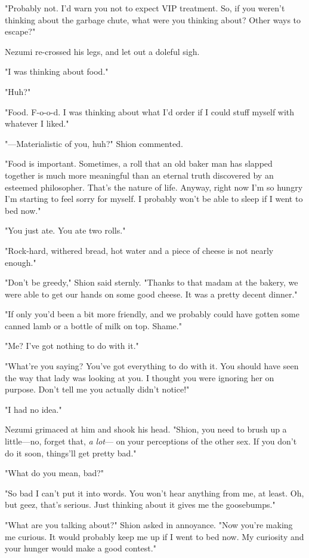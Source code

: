 "Probably not. I'd warn you not to expect VIP treatment. So, if you
weren't thinking about the garbage chute, what were you thinking about?
Other ways to escape?"

Nezumi re-crossed his legs, and let out a doleful sigh.

"I was thinking about food."

"Huh?"

"Food. F-o-o-d. I was thinking about what I'd order if I could stuff
myself with whatever I liked."

"---Materialistic of you, huh?" Shion commented.

"Food is important. Sometimes, a roll that an old baker man has slapped
together is much more meaningful than an eternal truth discovered by an
esteemed philosopher. That's the nature of life. Anyway, right now I'm
so hungry I'm starting to feel sorry for myself. I probably won't be
able to sleep if I went to bed now."

"You just ate. You ate two rolls."

"Rock-hard, withered bread, hot water and a piece of cheese is not
nearly enough."

"Don't be greedy," Shion said sternly. "Thanks to that madam at the
bakery, we were able to get our hands on some good cheese. It was a
pretty decent dinner."

"If only you'd been a bit more friendly, and we probably could have
gotten some canned lamb or a bottle of milk on top. Shame."

"Me? I've got nothing to do with it."

"What're you saying? You've got everything to do with it. You should
have seen the way that lady was looking at you. I thought you were
ignoring her on purpose. Don't tell me you actually didn't notice!"

"I had no idea."

Nezumi grimaced at him and shook his head. "Shion, you need to brush up
a little---no, forget that, \emph{a lot}--- on your perceptions of the other sex.
If you don't do it soon, things'll get pretty bad."

"What do you mean, bad?"

"So bad I can't put it into words. You won't hear anything from me, at
least. Oh, but geez, that's serious. Just thinking about it gives me the
goosebumps."

"What are you talking about?" Shion asked in annoyance. "Now you're
making me curious. It would probably keep me up if I went to bed now. My
curiosity and your hunger would make a good contest."

